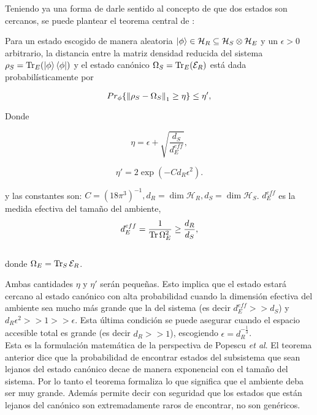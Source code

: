 Teniendo ya una forma de darle sentido al concepto de que dos estados son cercanos, se puede plantear el teorema central de \cite{Popescu2006}:
\\
\begin{theorem} \label{teorema principal}
Para un estado escogido de manera aleatoria $\ket{\phi} \in \mathcal{H}_{R} \subseteq \mathcal{H}_{S} \otimes \mathcal{H}_{E} $ y un $\epsilon > 0$ arbitrario, la distancia entre la matriz densidad reducida del sistema $\rho_{S}=\Tr_{E}(\ket{\phi} \bra{\phi})$  y el estado canónico $\Omega_{S}=\Tr_{E} ( \mathcal{E}_{R})$ está dada probabilísticamente por 

\begin{equation}
Pr_{\phi} \{  \norm{\rho_{S} -\Omega_{S}}_{1} \geq \eta \} \leq \eta',
\end{equation}

Donde 

\begin{equation}
\eta= \epsilon + \sqrt{ \frac{d_{S}}{d_{E}^{eff}} },
\end{equation}

\begin{equation}
\eta'=2\exp (-C d_{R} \epsilon^{2} ).
\end{equation}

y las constantes son: $ C=(18 \pi^{3})^{-1}, d_{R} = \dim \mathcal{H}_{R}, d_{S} = \dim \mathcal{H}_{S} $. $d_{E}^{eff}$ es la medida efectiva del tamaño del ambiente,
\begin{equation}
d_{E}^{eff}= \frac{1}{\Tr \Omega_{E}^{2}} \ge \frac{d_{R}}{d_{S}},
\end{equation}
\\
donde $\Omega_{E}= \Tr_{S} \mathcal{E}_{R}$.\\
\end{theorem}

Ambas cantidades $\eta $ y $\eta'$ serán pequeñas. Esto implica que el estado estará cercano al estado canónico con alta probabilidad cuando la dimensión efectiva del ambiente sea mucho más grande que la del sistema (es decir $d_{E}^{eff} >> d_{S}$) y  $d_{R}\epsilon^2>>1>>\epsilon$. Esta última condición se puede asegurar cuando el espacio accesible total es grande (es decir $d_{R}>>1$), escogiendo $\epsilon=d_{R}^{-\frac{1}{3}}$.\\
Esta es la formulación matemática de la perspectiva de Popescu \textit{et al}. El teorema anterior dice que la probabilidad de encontrar estados del subsistema que sean lejanos del estado canónico decae de manera exponencial con el tamaño del sistema. Por lo tanto el teorema formaliza lo que significa que el ambiente deba ser muy grande. Además permite decir con seguridad que los estados que están lejanos del canónico son extremadamente raros de encontrar, no son genéricos.
\\

